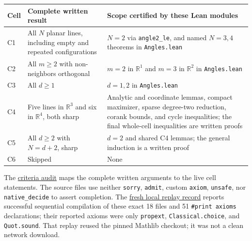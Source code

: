 \documentclass[11pt,a4paper]{article}
\begin{document}
{\def\LTcaptype{none} %
\begin{longtable}[]{@{}
  >{\raggedright\arraybackslash}p{}
  >{\raggedright\arraybackslash}p{}
  >{\raggedright\arraybackslash}p{}@{}}
\toprule\noalign{}
\begin{minipage}[b]{\linewidth}\raggedright
Cell
\end{minipage} & \begin{minipage}[b]{\linewidth}\raggedright
Complete written result
\end{minipage} & \begin{minipage}[b]{\linewidth}\raggedright
Scope certified by these Lean modules
\end{minipage} \\
\midrule\noalign{}
\endhead
\bottomrule\noalign{}
\endlastfoot
C1 & All \(N\) planar lines, including empty and repeated configurations & \(N=2\) via \texttt{angle2\_le}, and named \(N=3,4\) theorems in \texttt{Angles.lean} \\
C2 & All \(m\ge2\) with non-neighbors orthogonal & \(m=2\) in \(\mathbb{R}^1\) and \(m=3\) in \(\mathbb{R}^2\) in \texttt{Angles.lean} \\
C3 & All \(d\ge1\) & \(d=1,2\) in \texttt{Angles.lean} \\
C4 & Five lines in \(\mathbb{R}^3\) and six in \(\mathbb{R}^4\), both sharp & Analytic and coordinate lemmas, compact maximizer, sparse degree-two reduction, corank bounds, and cycle inequalities; the final whole-cell inequalities are written proofs \\
C5 & All \(d\ge2\) with \(N=d+2\), sharp & \(d=2\) and shared C4 lemmas; the general induction is a written proof \\
C6 & Skipped & None \\
\end{longtable}
}

The \href{https://github.com/mpelteshki/climbing-to-the-frontier/blob/29fbb70da18564048f62492e43870f2f96a65463/cagent/p1/criteria-audit.md}{criteria audit} maps the complete written arguments to the live cell statements. The source files use neither \texttt{sorry}, \texttt{admit}, custom \texttt{axiom}, \texttt{unsafe}, nor \texttt{native\_decide} to assert completion. The \href{https://github.com/mpelteshki/climbing-to-the-frontier/blob/29fbb70da18564048f62492e43870f2f96a65463/cagent/p1/evidence/replay/README.md}{fresh local replay record} reports successful sequential compilation of these exact 18 files and 51 \texttt{\#print\ axioms} declarations; their reported axioms were only \texttt{propext}, \texttt{Classical.choice}, and \texttt{Quot.sound}. That replay reused the pinned Mathlib checkout; it was not a clean network download.
\end{document}
